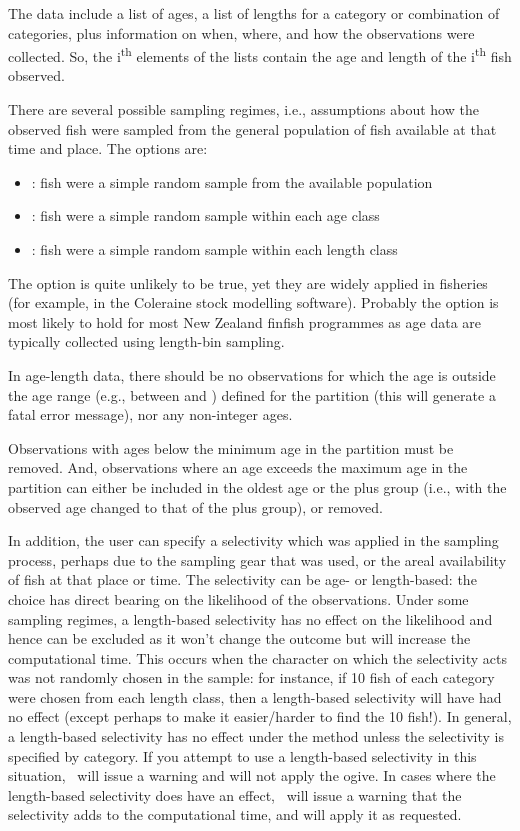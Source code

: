 The data include a list of ages, a list of lengths for a category or combination of categories, plus information on when, where, and how the observations were collected. So, the i\textsuperscript{th} elements of the lists contain the age and length of the i\textsuperscript{th} fish observed.

There are several possible sampling regimes, i.e., assumptions about how the observed fish were sampled from the general population of fish available at that time and place. The options are: 

\begin{itemize}
	\item {}: fish were a simple random sample from the available population
	\item {}: fish were a simple random sample within each age class 
	\item {}: fish were a simple random sample within each length class
\end{itemize}

The  option is quite unlikely to be true, yet they are widely applied in fisheries (for example, in the Coleraine \citep{hilborn2001coleraine} stock modelling software). Probably the  option is most likely to hold for most New Zealand finfish programmes as age data are typically collected using length-bin sampling.

In age-length data, there should be no observations for which the age is outside the age range (e.g., between  and ) defined for the partition (this will generate a fatal error message), nor any non-integer ages. 

Observations with ages below the minimum age in the partition must be removed. And, observations where an age exceeds the maximum age in the partition can either be included in the oldest age or the plus group (i.e., with the observed age changed to that of the plus group), or removed. 

In addition, the user can specify a selectivity which was applied in the sampling process, perhaps due to the sampling gear that was used, or the areal availability of fish at that place or time. The selectivity can be age- or length-based: the choice has direct bearing on the likelihood of the observations. Under some sampling regimes, a length-based selectivity has no effect on the likelihood and hence can be excluded as it won't change the outcome but will increase the computational time. This occurs when the character on which the selectivity acts was not randomly chosen in the sample: for instance, if 10 fish of each category were chosen from each length class, then a length-based selectivity will have had no effect (except perhaps to make it easier/harder to find the 10 fish!). In general, a length-based selectivity has no effect under the  method unless the selectivity is specified by category. If you attempt to use a length-based selectivity in this situation, \CNAME\ will issue a warning and will not apply the ogive. In cases where the length-based selectivity does have an effect, \CNAME\ will issue a warning that the selectivity adds to the computational time, and will apply it as requested.

